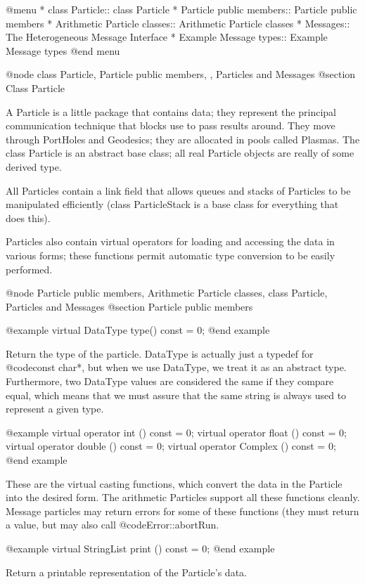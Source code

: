 @menu
* class Particle::  class Particle
* Particle public members::  Particle public members
* Arithmetic Particle classes::  Arithmetic Particle classes
* Messages::        The Heterogeneous Message Interface
* Example Message types::  Example Message types
@end menu

@node class Particle, Particle public members,  , Particles and Messages
@section Class Particle

A Particle is a little package that contains data; they represent the
principal communication technique that blocks use to pass results
around.  They move through PortHoles and Geodesics; they are allocated
in pools called Plasmas.  The class Particle is an abstract base class;
all real Particle objects are really of some derived type.

All Particles contain a link field that allows queues and stacks of
Particles to be manipulated efficiently (class ParticleStack is a base
class for everything that does this).

Particles also contain virtual operators for loading and accessing the
data in various forms; these functions permit automatic type conversion
to be easily performed.

@node Particle public members, Arithmetic Particle classes, class Particle, Particles and Messages
@section Particle public members

@example
virtual DataType type() const = 0;
@end example

Return the type of the particle.  DataType is actually just a typedef
for @code{const char*}, but when we use DataType, we treat it as an
abstract type.  Furthermore, two DataType values are considered the
same if they compare equal, which means that we must assure that
the same string is always used to represent a given type.

@example
virtual operator int () const = 0;
virtual operator float () const = 0;
virtual operator double () const = 0;
virtual operator Complex () const = 0;
@end example

These are the virtual casting functions, which convert the data in
the Particle into the desired form.  The arithmetic Particles support
all these functions cleanly.  Message particles may return errors for
some of these functions (they must return a value, but may also call
@code{Error::abortRun}.

@example
virtual StringList print () const = 0;
@end example

Return a printable representation of the Particle's data.

